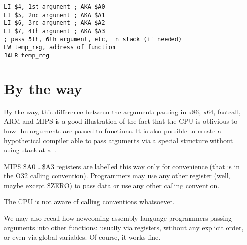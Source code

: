 \begin{lstlisting}[caption=MIPS (O32 calling convention)]
LI $4, 1st argument ; AKA $A0
LI $5, 2nd argument ; AKA $A1
LI $6, 3rd argument ; AKA $A2
LI $7, 4th argument ; AKA $A3
; pass 5th, 6th argument, etc, in stack (if needed)
LW temp_reg, address of function
JALR temp_reg
\end{lstlisting}

\section{By the way}

By the way, this difference between the arguments passing in x86, x64, 
fastcall, ARM and MIPS is a good illustration of the fact that the CPU is oblivious to how the arguments are passed to functions. 
It is also possible to create a hypothetical compiler able to pass arguments 
via a special structure without using stack at all.

MIPS \$A0 \dots \$A3 registers are labelled this way only for convenience (that is in the O32 calling convention).
Programmers may use any other register (well, maybe except \$ZERO) 
to pass data or use any other calling convention.

The \ac{CPU} is not aware of calling conventions whatsoever.

We may also recall how newcoming assembly language programmers passing arguments into
other functions: usually via registers, without any explicit order, or even via global variables.
Of course, it works fine.

